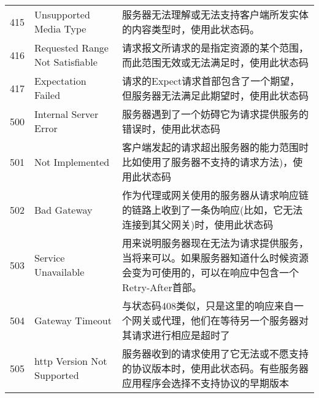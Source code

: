 \begin{longtable}{|c|l|l|}
415 & Unsupported Media Type & 服务器无法理解或无法支持客户端所发实体的内容类型时，使用此状态码。\\
416 & Requested Range Not Satisfiable & 请求报文所请求的是指定资源的某个范围，而此范围无效或无法满足时，使用此状态码\\
417 & Expectation Failed & 请求的Expect请求首部包含了一个期望，但服务器无法满足此期望时，使用此状态码\\
500 & Internal Server Error & 服务器遇到了一个妨碍它为请求提供服务的错误时，使用此状态码\\
501 & Not Implemented & 客户端发起的请求超出服务器的能力范围时比如使用了服务器不支持的请求方法)，使用此状态码\\
502 & Bad Gateway & 作为代理或网关使用的服务器从请求响应链的链路上收到了一条伪响应(比如，它无法连接到其父网关)时，使用此状态码\\
503 & Service Unavailable & 用来说明服务器现在无法为请求提供服务，当将来可以。如果服务器知道什么时候资源会变为可使用的，可以在响应中包含一个Retry-After首部。\\
504 & Gateway Timeout & 与状态码408类似，只是这里的响应来自一个网关或代理，他们在等待另一个服务器对其请求进行相应是超时了\\
505 & http Version Not Supported & 服务器收到的请求使用了它无法或不愿支持的协议版本时，使用此状态码。有些服务器应用程序会选择不支持协议的早期版本\\
\hline
\end{longtable}   %

